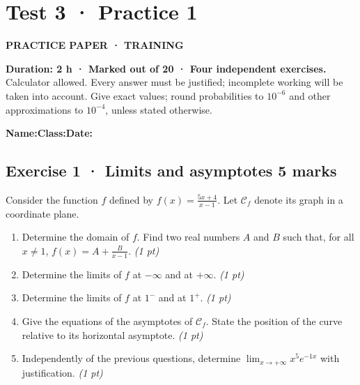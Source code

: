 \clearpage{}\label{sujet:4-1}

\section*{Test 3 · Practice 1}

{\sffamily\bfseries\color{teal}PRACTICE PAPER · TRAINING\par}

\textbf{Duration: 2 h · Marked out of 20 · Four independent exercises.}\\Calculator allowed. Every answer must be justified; incomplete working will be taken into account. Give exact values; round probabilities to $10^{-6}$ and other approximations to $10^{-4}$, unless stated otherwise.

\smallskip\textbf{Name:}\enspace\dotfill\quad\textbf{Class:}\enspace\dotfill\quad\textbf{Date:}\enspace\dotfill

\subsection*{Exercise 1 · Limits and asymptotes \hfill 5 marks}Consider the function $f$ defined by $f(x)=\frac{5x+4}{x-1}$. Let $\mathcal C_f$ denote its graph in a coordinate plane.

\begin{enumerate}

\item Determine the domain of $f$. Find two real numbers $A$ and $B$ such that, for all $x\ne1$, $f(x)=A+\frac B{x-1}$. \hfill\textit{(1 pt)}

\item Determine the limits of $f$ at $-\infty$ and at $+\infty$. \hfill\textit{(1 pt)}

\item Determine the limits of $f$ at $1^-$ and at $1^+$. \hfill\textit{(1 pt)}

\item Give the equations of the asymptotes of $\mathcal C_f$. State the position of the curve relative to its horizontal asymptote. \hfill\textit{(1 pt)}

\item Independently of the previous questions, determine $\displaystyle\lim_{x\to+\infty}x^{5}e^{-1x}$ with justification. \hfill\textit{(1 pt)}

\end{enumerate}


